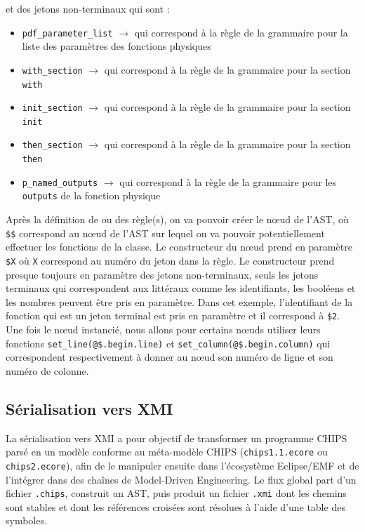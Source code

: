 \documentclass[a4paper, 11pt]{article}
\newcommand{\prog}[1]{\texttt{#1}}
\begin{document}
et des jetons non-terminaux qui sont :
\begin{itemize}
    \item \prog{pdf\_parameter\_list} $\longrightarrow$ qui correspond à la règle de la grammaire pour la liste des paramètres des fonctions physiques
    \item \prog{with\_section} $\longrightarrow$ qui correspond à la règle de la grammaire pour la section \prog{with}
    \item \prog{init\_section} $\longrightarrow$ qui correspond à la règle de la grammaire pour la section \prog{init}
    \item \prog{then\_section} $\longrightarrow$ qui correspond à la règle de la grammaire pour la section \prog{then}
    \item \prog{p\_named\_outputs} $\longrightarrow$ qui correspond à la règle de la grammaire pour les \prog{outputs} de la fonction physique
\end{itemize}

Après la définition de ou des règle(s), on va pouvoir créer le nœud de l'AST, où \verb|$$| correspond au nœud de l'AST sur lequel on va pouvoir potentiellement effectuer les fonctions de la classe. Le constructeur du nœud prend en paramètre \verb|$X| où \prog{X} correspond au numéro du jeton dans la règle. Le constructeur prend presque toujours en paramètre des jetons non-terminaux, seuls les jetons terminaux qui correspondent aux littéraux comme les identifiants, les booléens et les nombres peuvent être pris en paramètre. Dans cet exemple, l'identifiant de la fonction qui est un jeton terminal est pris en paramètre et il correspond à \verb|$2|. \\

Une fois le nœud instancié, nous allons pour certains nœuds utiliser leurs fonctions \verb|set_line(@$.begin.line)| et \verb|set_column(@$.begin.column)| qui correspondent respectivement à donner au nœud son numéro de ligne et son numéro de colonne.

\subsection{Sérialisation vers XMI}

La sérialisation vers XMI a pour objectif de transformer un programme CHIPS parsé en un modèle conforme au méta-modèle CHIPS (\prog{chips1.1.ecore} ou \prog{chips2.ecore}), afin de le manipuler ensuite dans l’écosystème Eclipse/EMF et de l’intégrer dans des chaînes de Model-Driven Engineering. Le flux global part d’un fichier \prog{.chips}, construit un AST, puis produit un fichier \prog{.xmi} dont les chemins sont stables et dont les références croisées sont résolues à l’aide d’une table des symboles.
\end{document}
